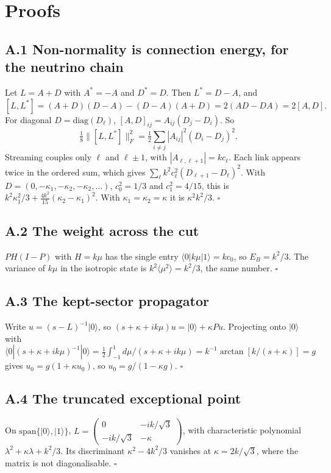 \documentclass[11pt]{article}
\begin{document}
\appendix
\section{Proofs}
\subsection*{A.1 Non-normality is connection energy, for the neutrino chain}
Let $L=A+D$ with $A^\ast=-A$ and $D^\ast=D$. Then $L^\ast=D-A$, and
\[
[L,L^\ast]=(A+D)(D-A)-(D-A)(A+D)=2(AD-DA)=2[A,D].
\]
For diagonal $D=\mathrm{diag}(D_\ell)$, $[A,D]_{ij}=A_{ij}(D_j-D_i)$. So
\[
\tfrac18\lVert[L,L^\ast]\rVert_F^2=\tfrac12\sum_{i\neq j}|A_{ij}|^2(D_i-D_j)^2 .
\]
Streaming couples only $\ell$ and $\ell\pm1$, with $|A_{\ell,\ell+1}|=kc_\ell$. Each link appears twice in the ordered sum, which gives $\sum_\ell k^2c_\ell^2(D_{\ell+1}-D_\ell)^2$. With $D=(0,-\kappa_1,-\kappa_2,-\kappa_2,\dots)$, $c_0^2=1/3$ and $c_1^2=4/15$, this is $k^2\kappa_1^2/3+\tfrac{4k^2}{15}(\kappa_2-\kappa_1)^2$. With $\kappa_1=\kappa_2=\kappa$ it is $\kappa^2k^2/3$. $\square$
\subsection*{A.2 The weight across the cut}
$PH(I-P)$ with $H=k\mu$ has the single entry $\langle0|k\mu|1\rangle=kc_0$, so $E_B=k^2/3$. The variance of $k\mu$ in the isotropic state is $k^2\langle\mu^2\rangle=k^2/3$, the same number. $\square$
\subsection*{A.3 The kept-sector propagator}
Write $u=(s-L)^{-1}|0\rangle$, so $(s+\kappa+ik\mu)u=|0\rangle+\kappa Pu$. Projecting onto $|0\rangle$ with $\langle0|(s+\kappa+ik\mu)^{-1}|0\rangle=\tfrac12\int_{-1}^{1}d\mu/(s+\kappa+ik\mu)=k^{-1}\arctan[k/(s+\kappa)]=g$ gives $u_0=g(1+\kappa u_0)$, so $u_0=g/(1-\kappa g)$. $\square$
\subsection*{A.4 The truncated exceptional point}
On $\mathrm{span}\{|0\rangle,|1\rangle\}$, $L=\begin{pmatrix}0&-ik/\sqrt3\\-ik/\sqrt3&-\kappa\end{pmatrix}$, with characteristic polynomial $\lambda^2+\kappa\lambda+k^2/3$. Its discriminant $\kappa^2-4k^2/3$ vanishes at $\kappa=2k/\sqrt3$, where the matrix is not diagonalisable. $\square$
\end{document}
